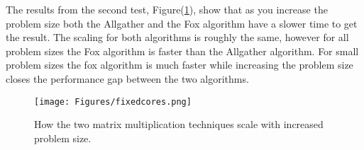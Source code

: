 \documentclass[11pt,a4paper,oneside]{report}
\begin{document}
The results from the second test, Figure(\ref{fig:fixedcores}), show that as you increase the problem size both the Allgather and the Fox algorithm have a slower time to get the result.  The scaling for both algorithms is roughly the same, however for all problem sizes the Fox algorithm is faster than the Allgather algorithm.  For small problem sizes the fox algorithm is much faster while increasing the problem size closes the performance gap between the two algorithms.

\begin{figure}[htpb]
  \centering
  \texttt{[image: Figures/fixedcores.png]}
  \caption{How the two matrix multiplication techniques scale with increased problem size.}
  \label{fig:fixedcores}
\end{figure}
\end{document}
